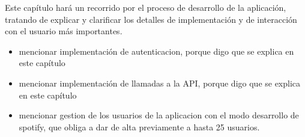 Este capítulo hará un recorrido por el proceso de desarrollo de la aplicación, tratando de explicar y clarificar los 
detalles de implementación y de interacción con el usuario más importantes.

\begin{itemize}
    \item mencionar implementación de autenticacion, porque digo que se explica en este capítulo
    \item mencionar implementación de llamadas a la API, porque digo que se explica en este capítulo
    \item mencionar gestion de los usuarios de la aplicacion con el modo desarrollo de spotify,
    que obliga a dar de alta previamente a hasta 25 usuarios.
\end{itemize}